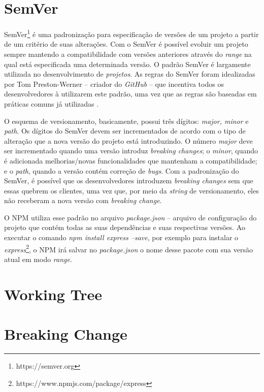 \section{\gls{SemVer}}
\label{ref-teo:semver}
\gls{SemVer}\footnote{https://semver.org} é uma padronização para especificação de versões de um projeto a partir de um critério de suas alterações. Com o \gls{SemVer} é possível evoluir um projeto sempre mantendo a compatibilidade com versões anteriores através do \textit{range} na qual está especificada uma determinada versão. 
O padrão \gls{SemVer} é largamente utilizada no desenvolvimento de \textit{projetos}. As regras do \gls{SemVer} foram idealizadas por Tom Preston-Werner -- criador do \textit{GitHub} -- que incentiva todos os desenvolvedores à utilizarem este padrão, uma vez que as regras são baseadas em práticas comuns já utilizadas \cite{teorical_reference:semver}.

O esquema de versionamento, basicamente, possui três dígitos: \textit{major, minor} e \textit{path}. Os dígitos do \gls{SemVer} devem ser incrementados de acordo com o tipo de alteração que a nova versão do projeto está introduzindo. O número \textit{major} deve ser incrementado quando uma versão introduz \textit{breaking changes}; o \textit{minor}, quando é adicionada melhorias/novas funcionalidades que mantenham a compatibilidade; e o \textit{path}, quando a versão contém correção de \textit{bugs}. Com a padronização do \gls{SemVer}, é possível que os desenvolvedores introduzem \textit{breaking changes} sem que essas quebrem os clientes, uma vez que, por meio da \textit{string} de versionamento, eles não receberam a nova versão com \textit{breaking change}.

O \gls{NPM} utiliza esse padrão no arquivo \textit{package.json} -- arquivo de configuração do projeto que contém todas as suas dependências e suas respectivas versões. Ao executar o comando \textit{npm install express --save}, por exemplo para instalar o \textit{express}\footnote{https://www.npmjs.com/package/express}, o \gls{NPM} irá salvar no \textit{package.json} o nome desse pacote com sua versão atual em modo \textit{range}.



\section{Working Tree}
\label{ref-teo:working_tree}

\section{Breaking Change}
\label{ref-teo:breaking_change}
